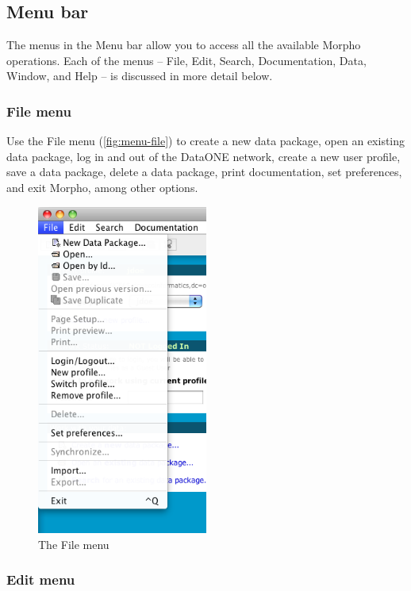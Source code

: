 \subsection{Menu bar} \label{sec:menu-bar}

The menus in the Menu bar allow you to access all the available Morpho
operations. Each of the menus -- File, Edit, Search, Documentation,
Data, Window, and Help -- is discussed in more detail below.

\subsubsection{File menu} \label{sec:menu-file}

Use the File menu (\autoref{fig:menu-file}) to create a new data
package, open an existing data package, log in and out of the DataONE 
network, create a new user profile, save a data package, delete a data
package, print documentation, set preferences, and exit Morpho, among
other options. 

\begin{figure}
  \centering
    \includegraphics[width=0.5\textwidth]{images/menu-file.png}
  \caption{The File menu}
  \label{fig:menu-file}
\end{figure}

\subsubsection{Edit menu} \label{sec:menu-edit}

